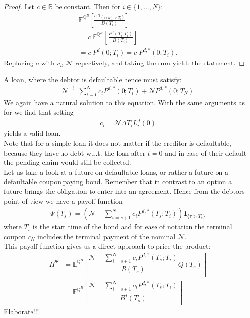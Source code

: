 \documentclass[12pt]{article}
\newcommand{\mbeq}{\overset{!}{=}}
\begin{document}
	\begin{proof}
		Let $c\in \mathbb{R}$ be constant. Then for $i \in \{1, ..., N\}$:
		\begin{align*}
			\mathbb{E}^{\mathbb{Q}^B}\left[\frac{c\;\mathbf{1}_{\left\{\tau(\omega) > T_{i} \right\}}}{B(T_i)}\right]\\
			= c \; \mathbb{E}^{\mathbb{Q}^B}\left[ 
			\frac{P^d(T_i;T_i)}{B(T_i)} \right]\\
			= c \; P^d(0;T_i) = c \; P^{d,*}(0;T_i).
		\end{align*}
		Replacing $c$ with $c_i$, $\mathcal{N}$ repectively, and taking the sum yields the statement.
	\end{proof}
	A loan, where the debtor is defaultable hence must satisfy:
	\begin{align*}
		\mathcal{N} \mbeq \sum_{i=1}^{N}c_i P^{d,*}(0;T_i) + \mathcal{N}P^{d,*}(0;T_N)
	\end{align*}
	We again have a natural solution to this equation. With the same arguments as for  we find that setting
	\begin{align*}
		c_i = \mathcal{N}\Delta T_iL^d_i(0)
	\end{align*}
	yields a valid loan.\\
	Note that for a simple loan it does not matter if the creditor is defaultable, because they have no debt w.r.t. the loan after $t=0$ and in case of their default the pending claim would still be collected.\\
	Let us take a look at a future on defaultable loans, or rather a future on a defaultable coupon paying bond. 
	Remember that in contrast to an option a future brings the obligation to enter into an agreement.
	Hence from the debtors point of view we have a payoff function
	\begin{align*}
		\Psi(T_s) = \left(\mathcal{N} - \sum_{i=s+1}^{N}c_iP^{d,*}(T_s; T_i)\right)\mathbf{1}_{\{\tau > T_s\}}
	\end{align*}
	where $T_s$ is the start time of the bond and for ease of notation the terminal coupon $c_N$ includes the terminal payment of the nominal $\mathcal{N}$.\\
	This payoff function gives us a direct approach to price the product:
	\begin{align*}
		\Pi^\Psi &= \mathbb{E}^{\mathbb{Q}^B}\left[\dfrac{\mathcal{N} - \sum_{i=s+1}^{N}c_iP^{d,*}(T_s; T_i)}{B(T_s)}Q(T_s)\right]\\
		&= \mathbb{E}^{\mathbb{Q}^B}\left[\dfrac{\mathcal{N} - \sum_{i=s+1}^{N}c_iP^{d,*}(T_s; T_i)}{B^d(T_s)}\right]
	\end{align*}
	\color{red}Elaborate!!!\color{black}. 
\end{document}
